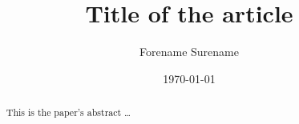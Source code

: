 \title{Title of the article} 
\author{Forename Surename} 
\date{\today}

\maketitle

\begin{abstract}
This is the paper's abstract \ldots
\end{abstract}